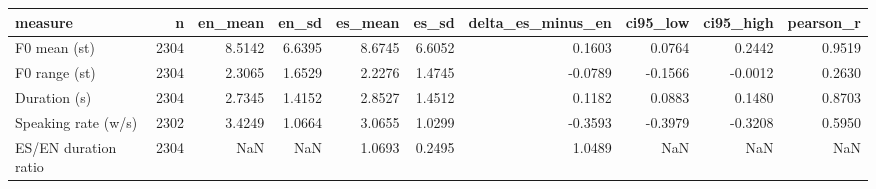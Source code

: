 \begin{tabular}{lrrrrrrrrr}
\toprule
measure & n & en_mean & en_sd & es_mean & es_sd & delta_es_minus_en & ci95_low & ci95_high & pearson_r \\
\midrule
F0 mean (st) & 2304 & 8.5142 & 6.6395 & 8.6745 & 6.6052 & 0.1603 & 0.0764 & 0.2442 & 0.9519 \\
F0 range (st) & 2304 & 2.3065 & 1.6529 & 2.2276 & 1.4745 & -0.0789 & -0.1566 & -0.0012 & 0.2630 \\
Duration (s) & 2304 & 2.7345 & 1.4152 & 2.8527 & 1.4512 & 0.1182 & 0.0883 & 0.1480 & 0.8703 \\
Speaking rate (w/s) & 2302 & 3.4249 & 1.0664 & 3.0655 & 1.0299 & -0.3593 & -0.3979 & -0.3208 & 0.5950 \\
ES/EN duration ratio & 2304 & NaN & NaN & 1.0693 & 0.2495 & 1.0489 & NaN & NaN & NaN \\
\bottomrule
\end{tabular}
